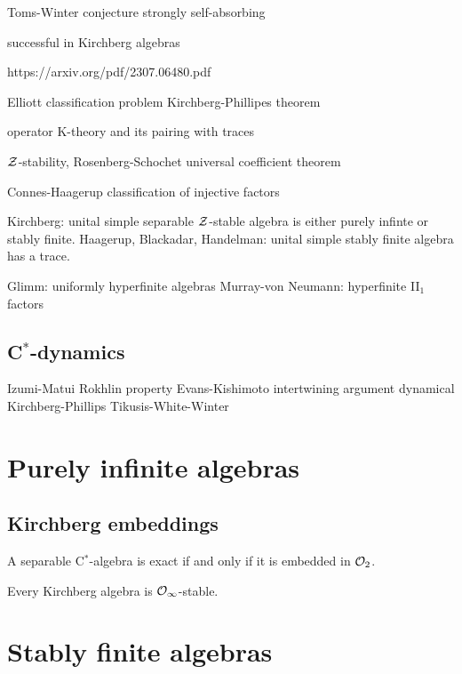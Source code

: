 \documentclass{../../large}
\begin{document}
Toms-Winter conjecture
strongly self-absorbing




successful in Kirchberg algebras


https://arxiv.org/pdf/2307.06480.pdf

Elliott classification problem
Kirchberg-Phillipes theorem

operator K-theory and its pairing with traces

$\mathcal{Z}$-stability, Rosenberg-Schochet universal coefficient theorem

Connes-Haagerup classification of injective factors

Kirchberg: unital simple separable $\mathcal{Z}$-stable algebra is either purely infinte or stably finite.
Haagerup, Blackadar, Handelman: unital simple stably finite algebra has a trace.

Glimm: uniformly hyperfinite algebras
Murray-von Neumann: hyperfinite II$_1$ factors





\section{C$^*$-dynamics}

Izumi-Matui
Rokhlin property
Evans-Kishimoto intertwining argument
dynamical Kirchberg-Phillips
Tikusis-White-Winter







\chapter{Purely infinite algebras}

\section{Kirchberg embeddings}
A separable C$^*$-algebra is exact if and only if it is embedded in $\mathcal{O}_2$.

Every Kirchberg algebra is $\mathcal{O}_\infty$-stable.

\chapter{Stably finite algebras}
\end{document}
